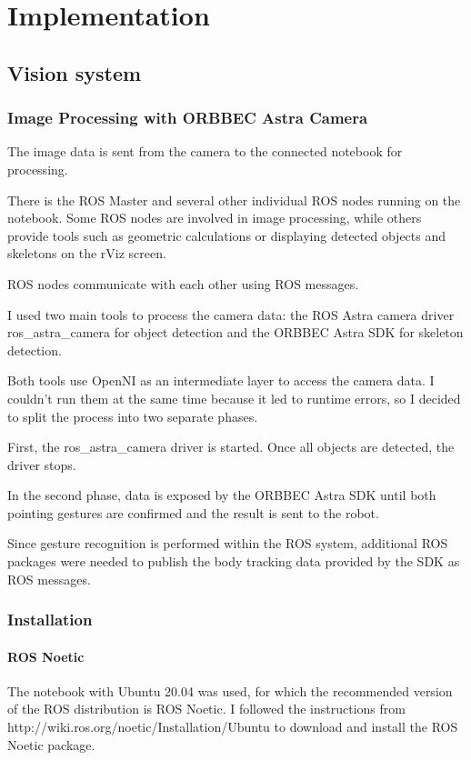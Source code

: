 \chapter{Implementation}

\section{Vision system}

\subsection{Image Processing with ORBBEC Astra Camera}
The image data is sent from the camera to the connected notebook for processing.\par
There is the ROS Master and several other individual ROS nodes running on the notebook. Some ROS nodes are involved in image processing, while others provide tools such as geometric calculations or displaying detected objects and skeletons on the rViz screen.\par
ROS nodes communicate with each other using ROS messages.\par
I used two main tools to process the camera data: the ROS Astra camera driver ros\_astra\_camera for object detection and the ORBBEC Astra SDK for skeleton detection.\par
Both tools use OpenNI as an intermediate layer to access the camera data. I couldn't run them at the same time because it led to runtime errors, so I decided to split the process into two separate phases.\par
First, the ros\_astra\_camera driver is started. Once all objects are detected, the driver stops.\par
In the second phase, data is exposed by the ORBBEC Astra SDK until both pointing gestures are confirmed and the result is sent to the robot. \par
Since gesture recognition is performed within the ROS system, additional ROS packages were needed to publish the body tracking data provided by the SDK as ROS messages.\par

\subsection{Installation}

\subsubsection{ROS Noetic}
The notebook with Ubuntu 20.04 was used, for which the recommended version of the ROS distribution is ROS Noetic. I followed the instructions from http://wiki.ros.org/noetic/Installation/Ubuntu to download and install the ROS Noetic package.\par

